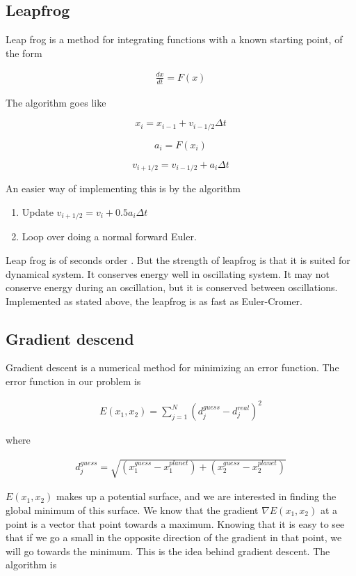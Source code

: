 \documentclass[a4paper, 10pt]{article}
\begin{document}
\subsection{Leapfrog}\label{sec:leap}

Leap frog is a method for integrating functions with a known starting point, of the form \cite{leap} 

\begin{align}
\frac{dx}{dt} = F(x)
\end{align}

The algorithm goes like

$$
x_i = x_{i-1} + v_{i-1/2}\Delta t
$$

$$
a_i = F(x_i)
$$

$$
v_{i+1/2} = v_{i-1/2} + a_i \Delta t
$$

An easier way of implementing this is by the algorithm

\begin{enumerate}
\item Update $v_{i+1/2} = v_{i} + 0.5a_i \Delta t$
\item Loop over doing a normal forward Euler.
\end{enumerate}

Leap frog is of seconds order \cite{leap2}. But the strength of leapfrog is that it is suited for dynamical system. It conserves energy well in oscillating system. It may not conserve energy during an oscillation, but it is conserved between oscillations. \\

Implemented as stated above, the leapfrog is as fast as Euler-Cromer. 
\subsection{Gradient descend}\label{sec:gradient}

Gradient descent is a numerical method for minimizing an error function. The error function in our problem is

\begin{align}
E(x_1,x_2) = \sum_{j=1}^N(d_j^{guess} - d_j^{real})^2
\end{align} 

where 

\begin{align}
d_j^{guess} = \sqrt{(x_1^{guess}-x_1^{planet}) + (x_2^{guess}-x_2^{planet})}
\end{align}

$E(x_1,x_2)$ makes up a potential surface, and we are interested in finding the global minimum of this surface. We know that the gradient $\nabla E(x_1,x_2)$ at a point is a vector that point towards a maximum. Knowing that it is easy to see that if we go a small in the opposite direction of the gradient in that point, we will go towards the minimum. This is the idea behind gradient descent. The algorithm is
\end{document}
